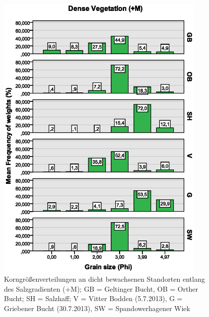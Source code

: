 \begin{figure}[!htb]
\centering
\includegraphics[trim = 0mm 35mm 0mm 0mm, clip, width=0.90\textwidth]{images/grainsize/korngroessenverteilungen_sg1.eps}
\caption[Korngrößenverteilungen entlang des Salzgradienten (+M)]{Korngrößenverteilungen an dicht bewachsenen Standorten entlang des Salzgradienten (+M); GB = Geltinger Bucht, OB = Orther Bucht; SH = Salzhaff; V = Vitter Bodden (5.7.2013), G = Griebener Bucht (30.7.2013), SW = Spandowerhagener Wiek}
\label{fig:korngrössen_salzgradient_+m}
\end{figure}

